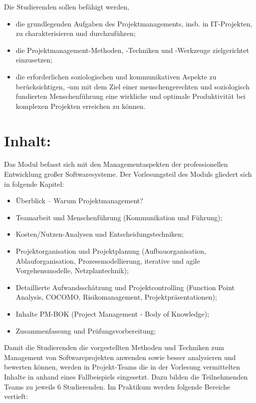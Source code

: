 Die Studierenden sollen befähigt werden,

\begin{itemize}
\tightlist
\item
  die grundlegenden Aufgaben des Projektmanagements, insb. in
  IT-Projekten, zu charakterisieren und durchzuführen;
\item
  die Projektmanagement-Methoden, -Techniken und -Werkzeuge
  zielgerichtet einzusetzen;
\item
  die erforderlichen soziologischen und kommunikativen Aspekte zu
  berücksichtigen, -um mit dem Ziel einer menschengerechten und
  soziologisch fundierten Menschenführung eine wirkliche und optimale
  Produktivität bei komplexen Projekten erreichen zu können.
\end{itemize}

\section{Inhalt:}\label{inhalt-20}

Das Modul befasst sich mit den Managementaspekten der professionellen
Entwicklung großer Softwaresysteme. Der Vorlesungsteil des Moduls
gliedert sich in folgende Kapitel:

\begin{itemize}
\tightlist
\item
  Überblick -- Warum Projektmanagement?
\item
  Teamarbeit und Menschenführung (Kommunikation und Führung);
\item
  Kosten/Nutzen-Analysen und Entscheidungstechniken;
\item
  Projektorganisation und Projektplanung (Aufbauorganisation,
  Ablauforganisation, Prozessmodellierung, iterative und agile
  Vorgehensmodelle, Netzplantechnik);
\item
  Detaillierte Aufwandsschätzung und Projektcontrolling (Function Point
  Analysis, COCOMO, Risikomanagement, Projektpräsentationen);
\item
  Inhalte PM-BOK (Project Management - Body of Knowledge);
\item
  Zusammenfassung und Prüfungsvorbereitung;
\end{itemize}

Damit die Studierenden die vorgestellten Methoden und Techniken zum
Management von Softwareprojekten anwenden sowie besser analysieren und
bewerten können, werden in Projekt-Teams die in der Vorlesung
vermittelten Inhalte in anhand eines Fallbeispiels eingesetzt. Dazu
bilden die Teilnehmenden Teams zu jeweils 6 Studierenden. Im Praktikum
werden folgende Bereiche vertieft:


